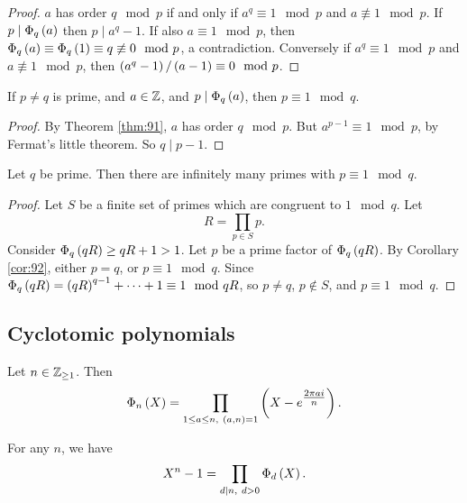 \begin{proof}
$ a $ has order $ q \mod p $ if and only if $ a^q \equiv 1 \mod p $ and $ a \not\equiv 1 \mod p $. If $ p \mid \Phi_q\br{a} $ then $ p \mid a^q - 1 $. If also $ a \equiv 1 \mod p $, then $ \Phi_q\br{a} \equiv \Phi_q\br{1} \equiv q \not\equiv 0 \mod p $, a contradiction. Conversely if $ a^q \equiv 1 \mod p $ and $ a \not\equiv 1 \mod p $, then $ \br{a^q - 1} / \br{a - 1} \equiv 0 \mod p $.
\end{proof}


\begin{corollary}
\label{cor:92}
If $ p \ne q $ is prime, and $ a \in \mathbb{Z} $, and $ p \mid \Phi_q\br{a} $, then $ p \equiv 1 \mod q $.
\end{corollary}

\begin{proof}
By Theorem \ref{thm:91}, $ a $ has order $ q \mod p $. But $ a^{p - 1} \equiv 1 \mod p $, by Fermat's little theorem. So $ q \mid p - 1 $.
\end{proof}

\begin{theorem}
Let $ q $ be prime. Then there are infinitely many primes with $ p \equiv 1 \mod q $.
\end{theorem}

\begin{proof}
Let $ S $ be a finite set of primes which are congruent to $ 1 \mod q $. Let
$$ R = \prod_{p \in S} p. $$
Consider $ \Phi_q\br{qR} \ge qR + 1 > 1 $. Let $ p $ be a prime factor of $ \Phi_q\br{qR} $. By Corollary \ref{cor:92}, either $ p = q $, or $ p \equiv 1 \mod q $. Since $ \Phi_q\br{qR} = \br{qR}^{q - 1} + \dots + 1 \equiv 1 \mod qR $, so $ p \ne q $, $ p \notin S $, and $ p \equiv 1 \mod q $.
\end{proof}

\subsection{Cyclotomic polynomials}

\begin{definition}
Let $ n \in \mathbb{Z}_{\ge 1} $. Then
$$ \Phi_n\br{X} = \prod_{1 \le a \le n, \ \br{a, n} = 1} \br{X - e^{\tfrac{2\pi ai}{n}}}. $$
\end{definition}

\begin{lemma}
\label{lem:95}
For any $ n $, we have
$$ X^n - 1 = \prod_{d \mid n, \ d > 0} \Phi_d\br{X}. $$
\end{lemma}

